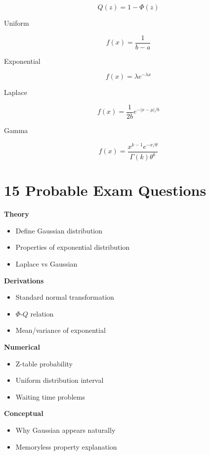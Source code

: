 \documentclass[12pt,a4paper]{article}
\begin{document}
\[
Q(z) = 1-\Phi(z)
\]

Uniform

\[
f(x)=\frac{1}{b-a}
\]

Exponential

\[
f(x)=\lambda e^{-\lambda x}
\]

Laplace

\[
f(x)=\frac{1}{2b} e^{-|x-\mu|/b}
\]

Gamma

\[
f(x)=\frac{x^{k-1} e^{-x/\theta}}{\Gamma(k)\theta^k}
\]

\section*{15 Probable Exam Questions}

\textbf{Theory}

\begin{itemize}
\item Define Gaussian distribution
\item Properties of exponential distribution
\item Laplace vs Gaussian
\end{itemize}

\textbf{Derivations}

\begin{itemize}
\item Standard normal transformation
\item $\Phi$-$Q$ relation
\item Mean/variance of exponential
\end{itemize}

\textbf{Numerical}

\begin{itemize}
\item Z-table probability
\item Uniform distribution interval
\item Waiting time problems
\end{itemize}

\textbf{Conceptual}

\begin{itemize}
\item Why Gaussian appears naturally
\item Memoryless property explanation
\end{itemize}
\end{document}
